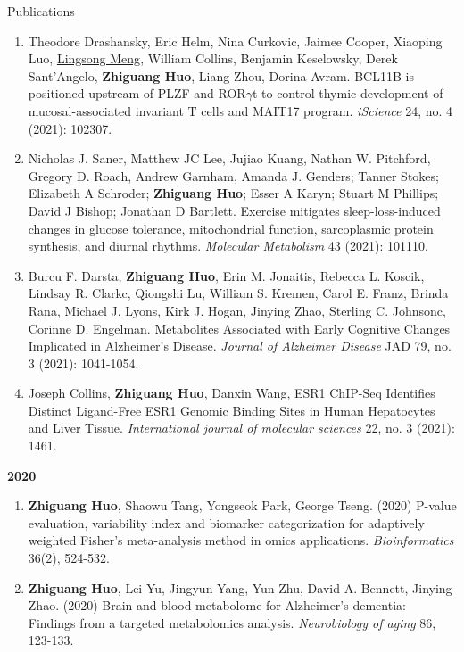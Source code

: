 \documentclass{resume} %
\begin{document}
\begin{rSection}{Publications}
\begin{enumerate}[noitemsep,topsep=0pt, resume]
\item
Theodore Drashansky, Eric Helm, Nina Curkovic, Jaimee Cooper, Xiaoping Luo, \underline{Lingsong Meng}, William Collins, Benjamin Keselowsky, Derek Sant'Angelo, {\bf Zhiguang Huo}, Liang Zhou, Dorina Avram.
BCL11B is positioned upstream of PLZF and ROR$\gamma$t to control thymic development of mucosal-associated invariant T cells and MAIT17 program.
\emph{iScience}  24, no. 4 (2021): 102307.

\item  
Nicholas J. Saner, Matthew JC Lee, Jujiao Kuang, Nathan W. Pitchford, Gregory D. Roach, Andrew Garnham, Amanda J. Genders; Tanner Stokes; Elizabeth A Schroder; {\bf Zhiguang Huo}; Esser A Karyn; Stuart M Phillips; David J Bishop; Jonathan D Bartlett.
Exercise mitigates sleep-loss-induced changes in glucose tolerance, mitochondrial function, sarcoplasmic protein synthesis, and diurnal rhythms.
\emph{Molecular Metabolism} 43 (2021): 101110.

\item  
Burcu F. Darsta, {\bf Zhiguang Huo}, Erin M. Jonaitis, Rebecca L. Koscik, Lindsay R. Clarkc, Qiongshi Lu, William S. Kremen, Carol E. Franz, Brinda Rana, Michael J. Lyons, Kirk J. Hogan, Jinying Zhao, Sterling C. Johnsonc, Corinne D. Engelman.
Metabolites Associated with Early Cognitive Changes Implicated in Alzheimer's Disease.
\emph{Journal of Alzheimer Disease} JAD 79, no. 3 (2021): 1041-1054.


\item  Joseph Collins, {\bf Zhiguang Huo}, Danxin Wang, 
ESR1 ChIP-Seq Identifies Distinct Ligand-Free ESR1 Genomic Binding Sites in Human Hepatocytes and Liver Tissue.
\emph{International journal of molecular sciences} 22, no. 3 (2021): 1461.

\end{enumerate}


\textbf{2020}
\begin{enumerate}[noitemsep,topsep=0pt, resume]


\item  {\bf  Zhiguang Huo}, Shaowu Tang, Yongseok Park, George Tseng. (2020) 
P-value evaluation, variability index and biomarker categorization for adaptively weighted Fisher's meta-analysis method in omics applications. 
\emph{Bioinformatics} 36(2), 524-532.

\item  {\bf Zhiguang Huo}, Lei Yu, Jingyun Yang, Yun Zhu,  David A. Bennett, Jinying Zhao. (2020)
Brain and blood metabolome for Alzheimer's dementia: Findings from a targeted metabolomics analysis.
\emph{Neurobiology of aging}  86, 123-133.


\end{enumerate}
\end{rSection}
\end{document}
